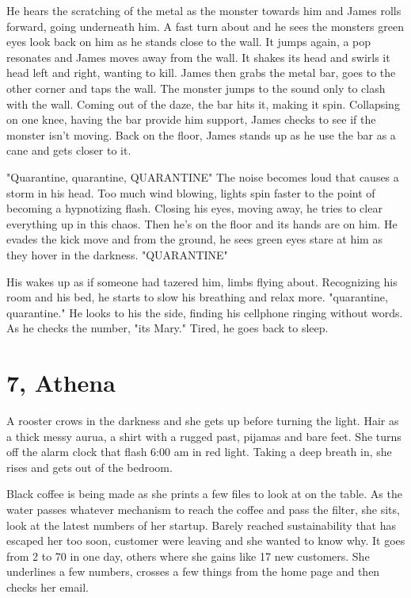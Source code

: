         He hears the scratching of the metal as the monster towards him and James rolls forward, going underneath him. A fast turn about and he
    sees the monsters green eyes look back on him as he stands close to the wall. It jumps again, a pop resonates and James moves away from the 
    wall. It shakes its head and swirls it head left and right, wanting to kill. James then grabs the metal bar, goes to the other corner and
    taps the wall. The monster jumps to the sound only to clash with the wall. Coming out of the daze, the bar hits it, making it spin.
    Collapsing on one knee, having the bar provide him support, James checks to see if the monster isn't moving. Back on the floor, James
    stands up as he use the bar as a cane and gets closer to it.

        "Quarantine, quarantine, QUARANTINE" The noise becomes loud that causes a storm in his head. Too much wind blowing, lights spin faster
    to the point of becoming a hypnotizing flash. Closing his eyes, moving away, he tries to clear everything up in this chaos. Then he's on
    the floor and its hands are on him. He evades the kick move and from the ground, he sees green eyes stare at him as they hover in the
    darkness. "QUARANTINE"

        His wakes up as if someone had tazered him, limbs flying about. Recognizing his room and his bed, he starts to slow his breathing
    and relax more. "quarantine, quarantine." He looks to his the side, finding his cellphone ringing without words. As he checks the number,
    "its Mary." Tired, he goes back to sleep.

\section{7, Athena}

        A rooster crows in the darkness and she gets up before turning the light. Hair as a thick messy aurua, a shirt with a rugged past,
    pijamas and bare feet. She turns off the alarm clock that flash 6:00 am in red light. Taking a deep breath in, she rises and gets out of
    the bedroom.

        Black coffee is being made as she prints a few files to look at on the table. As the water passes whatever mechanism to reach the coffee
    and pass the filter, she sits, look at the latest numbers of her startup. Barely reached sustainability that has escaped her too soon, 
    customer were leaving and she wanted to know why. It goes from 2 to 70 in one day, others where she gains like 17 new customers. She 
    underlines a few numbers, crosses a few things from the home page and then checks her email.


